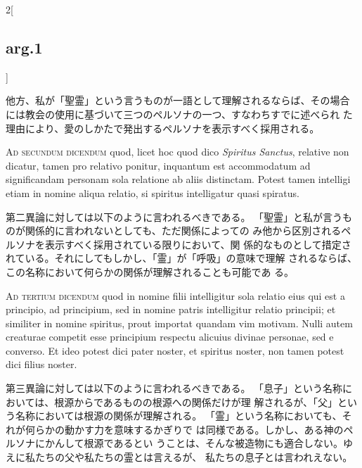 \documentclass[paper=a4paper,fontsize=10pt,jafontsize=9pt,titlepage]{jlreq}
\begin{document}
\begin{paracol}{2}[\subsection{arg.1}]
\switchcolumn

他方、私が「聖霊」という言うものが一語として理解されるならば、その場合
 には教会の使用に基づいて三つのペルソナの一つ、すなわちすでに述べられ
 た理由により、愛のしかたで発出するペルソナを表示すべく採用される。

\switchcolumn*[\subsection{ad.2}]

{\scshape Ad secundum dicendum} quod, licet hoc quod dico {\itshape Spiritus Sanctus},
relative non dicatur, tamen pro relativo ponitur, inquantum est
accommodatum ad significandam personam sola relatione ab aliis
distinctam. Potest tamen intelligi etiam in nomine aliqua relatio, si
spiritus intelligatur quasi spiratus.

\switchcolumn

第二異論に対しては以下のように言われるべきである。
「聖霊」と私が言うものが関係的に言われないとしても、ただ関係によっての
 み他から区別されるペルソナを表示すべく採用されている限りにおいて、関
 係的なものとして措定されている。それにしてもしかし、「霊」が「呼吸」の意味で理解
 されるならば、この名称において何らかの関係が理解されることも可能であ
 る。

\switchcolumn*[\subsection{ad.3}]

{\scshape Ad tertium dicendum} quod in nomine filii intelligitur sola relatio
eius qui est a principio, ad principium, sed in nomine patris
intelligitur relatio principii; et similiter in nomine spiritus, prout
importat quandam vim motivam. Nulli autem creaturae competit esse
principium respectu alicuius divinae personae, sed e converso. Et ideo
potest dici pater noster, et spiritus noster, non tamen potest dici
filius noster.

\switchcolumn

第三異論に対しては以下のように言われるべきである。
「息子」という名称においては、根源からであるものの根源への関係だけが理
 解されるが、「父」という名称においては根源の関係が理解される。
 「霊」という名称においても、それが何らかの動かす力を意味するかぎりで
 は同様である。しかし、ある神のペルソナにかんして根源であるとい
 うことは、そんな被造物にも適合しない。ゆえに私たちの父や私たちの霊とは言えるが、
 私たちの息子とは言われえない。

\end{paracol}
\newpage
\end{document}

